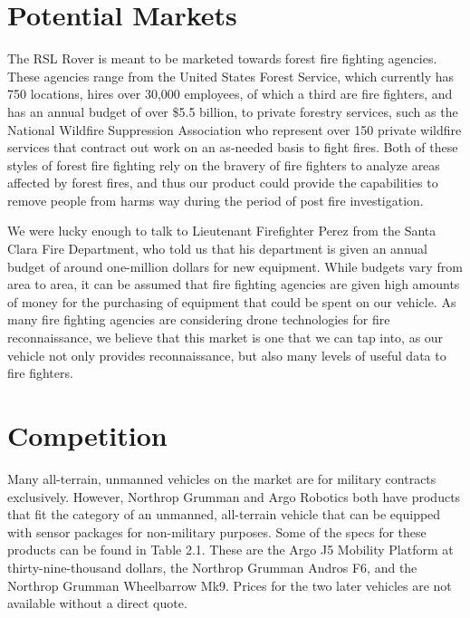 \section{Potential Markets}

The RSL Rover is meant to be marketed towards forest fire fighting agencies. These agencies range from the United States Forest Service, which currently has 750 locations, hires over 30,000 employees, of which a third are fire fighters, and has an annual budget of over \$5.5 billion, to private forestry services, such as the National Wildfire Suppression Association who represent over 150 private wildfire services that contract out work on an as-needed basis to fight fires. Both of these styles of forest fire fighting rely on the bravery of fire fighters to analyze areas affected by forest fires, and thus our product could provide the capabilities to remove people from harms way during the period of post fire investigation.

We were lucky enough to talk to Lieutenant Firefighter Perez from the Santa Clara Fire Department, who told us that his department is given an annual budget of around one-million dollars for new equipment. While budgets vary from area to area, it can be assumed that fire fighting agencies are given high amounts of money for the purchasing of equipment that could be spent on our vehicle. As many fire fighting agencies are considering drone technologies for fire reconnaissance, we believe that this market is one that we can tap into, as our vehicle not only provides reconnaissance, but also many levels of useful data to fire fighters. 

\section{Competition}

Many all-terrain, unmanned vehicles on the market are for military contracts exclusively. However, Northrop Grumman and Argo Robotics both have products that fit the category of an unmanned, all-terrain vehicle that can be equipped with sensor packages for non-military purposes. Some of the specs for these products can be found in Table 2.1. These are the Argo J5 Mobility Platform at thirty-nine-thousand dollars, the Northrop Grumman Andros F6, and the Northrop Grumman Wheelbarrow Mk9. Prices for the two later vehicles are not available without a direct quote. 

